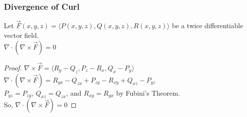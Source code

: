 \subsubsection{Divergence of Curl}
\begin{theorem}
	Let $\vec{F}(x,y,z) = \langle P(x,y,z), Q(x,y,z), R(x,y,z) \rangle$ be a twice differentiable vector field.\\
	$\nabla \cdot (\nabla \times \vec{F}) = 0$
\end{theorem}
\begin{proof}
	$\nabla \times \vec{F} = \langle R_y-Q_z, P_z-R_x, Q_x-P_y \rangle$\\
	$\nabla \cdot (\nabla \times \vec{F}) = R_{yx}-Q_{zx} + P_{zy}-R_{xy} + Q_{xz}-P_{yz}$\\
	$P_{yz} = P_{zy}$, $Q_{xz} = Q_{zx}$, and $R_{xy} = R_{yx}$ by Fubini's Theorem.\\
	So, $\nabla \cdot (\nabla \times \vec{F}) = 0$
\end{proof}